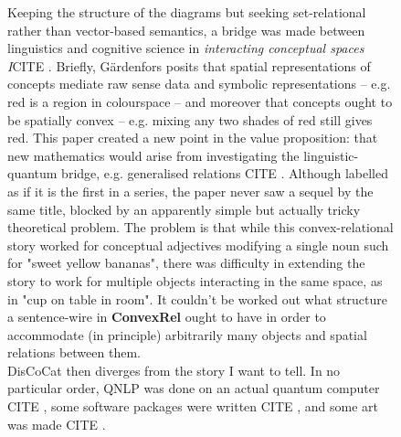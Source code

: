 \begin{figure}[h!]
\centering
{}
\caption{Keeping the structure of the diagrams but seeking set-relational rather than vector-based semantics, a bridge was made between linguistics and cognitive science in \emph{interacting conceptual spaces I}\bR CITE \e. Briefly, G\"{a}rdenfors posits that spatial representations of concepts mediate raw sense data and symbolic representations -- e.g. red is a region in colourspace -- and moreover that concepts ought to be spatially convex -- e.g. mixing any two shades of red still gives red. This paper created a new point in the value proposition: that new mathematics would arise from investigating the linguistic-quantum bridge, e.g. generalised relations \bR CITE \e. Although labelled as if it is the first in a series, the paper never saw a sequel by the same title, blocked by an apparently simple but actually tricky theoretical problem. The problem is that while this convex-relational story worked for conceptual adjectives modifying a single noun such for "sweet yellow bananas", there was difficulty in extending the story to work for multiple objects interacting in the same space, as in "cup on table in room". It couldn't be worked out what structure a sentence-wire in \textbf{ConvexRel} ought to have in order to accommodate (in principle) arbitrarily many objects and spatial relations between them.\\

DisCoCat then diverges from the story I want to tell. In no particular order, QNLP was done on an actual quantum computer \bR CITE \e, some software packages were written \bR CITE \e, and some art was made \bR CITE \e.}
\end{figure}
\clearpage



